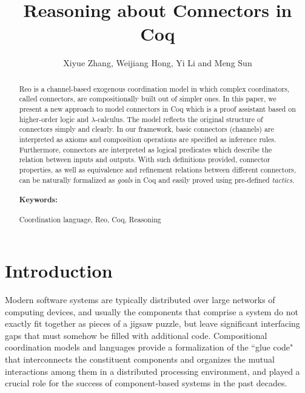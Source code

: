 \documentclass{llncs}
\begin{document}
\pagestyle{plain}
\mainmatter

\title{Reasoning about Connectors in Coq}


\author{Xiyue Zhang, Weijiang Hong, Yi Li and Meng Sun}



\maketitle
\begin{abstract}
Reo is a channel-based exogenous coordination model in which complex coordinators, called connectors, are compositionally
built out of simpler ones. In this paper, we present a new approach to model connectors in Coq which is a proof assistant based on higher-order logic and $\lambda$-calculus.
The model reflects the original structure of connectors simply and clearly. In our framework, basic connectors (channels) are interpreted as axioms and composition operations are specified as inference rules. Furthermore, connectors are interpreted as logical predicates which describe the relation
between inputs and outputs. With such definitions provided, connector properties, as well as equivalence and refinement relations between different connectors, can be naturally formalized as \emph{goals} in Coq and easily proved using pre-defined \emph{tactics}.
\paragraph*{Keywords:}
Coordination language, Reo, Coq, Reasoning
\end{abstract}

\section{Introduction}\label{sec:introduction}

Modern software systems are typically distributed over large networks of computing devices, and usually the components
that comprise a system do not exactly fit together as pieces of a jigsaw puzzle, but leave significant interfacing gaps
that must somehow be filled with additional code. Compositional coordination models and languages provide a formalization
of the ``glue code" that interconnects the constituent components and organizes the mutual interactions among them in a
distributed processing environment, and played a crucial role for the success of component-based systems in the past decades.
\end{document}
